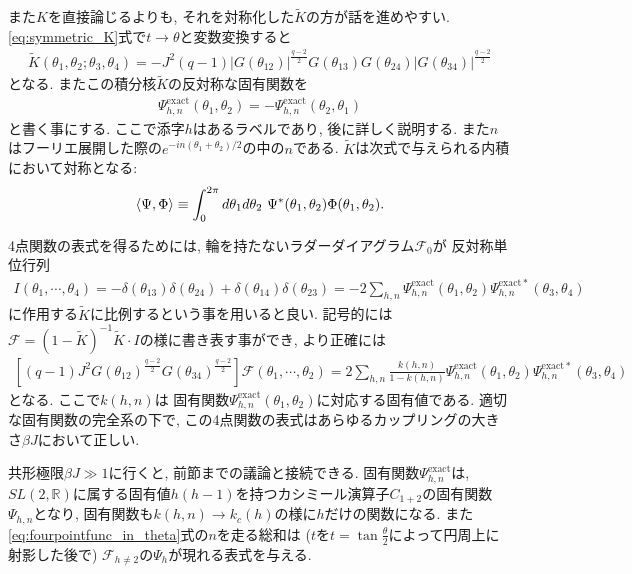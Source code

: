 また$K$を直接論じるよりも, それを対称化した$\tilde{K}$の方が話を進めやすい. 
\eqref{eq:symmetric_K}式で$t\to\theta$と変数変換すると
\begin{align}
	\tilde{K}(\theta_1, \theta_2; \theta_3, \theta_4)
	= -J^2(q-1)
		|G(\theta_{12})|^{\frac{q-2}{2}}
		G(\theta_{13})G(\theta_{24})
		|G(\theta_{34})|^{\frac{q-2}{2}}
	\label{eq:symmetric_K_in_theta}
\end{align}
となる. 
またこの積分核$\tilde{K}$の反対称な固有関数を
\begin{align}
	\Psi_{h,n}^{\mathrm{exact}}(\theta_1, \theta_2)
	= - \Psi_{h,n}^{\mathrm{exact}}(\theta_2, \theta_1)
\end{align}
と書く事にする. 
ここで添字$h$はあるラベルであり, 後に詳しく説明する. 
また$n$はフーリエ展開した際の$e^{-in(\theta_1 + \theta_2)/2}$の中の$n$である. 
$\tilde{K}$は次式で与えられる内積において対称となる:
\begin{align}
	\langle \Psi, \Phi \rangle \equiv
	\int_0^{2\pi}d\theta_1d\theta_2\ \Psi^*(\theta_1, \theta_2)\Phi(\theta_1, \theta_2).
	\label{eq:innerprod_in_finite_temp}
\end{align}

4点関数の表式を得るためには, 輪を持たないラダーダイアグラム$\mathcal{F}_0$が
反対称単位行列
\begin{align}
	I(\theta_1, \cdots, \theta_4)
	= -\delta(\theta_{13})\delta(\theta_{24}) + \delta(\theta_{14})\delta(\theta_{23})
	= -2\sum_{h,n}\Psi_{h,n}^{\mathrm{exact}}(\theta_1, \theta_2)
		\Psi_{h,n}^{\mathrm{exact}*}(\theta_3, \theta_4)
\end{align}
に作用する$\tilde{K}$に比例するという事を用いると良い. 
記号的には$\mathcal{F} = (1 - \tilde{K})^{-1}\tilde{K}\cdot I$の様に書き表す事ができ, 
より正確には
\begin{align}
	\left[(q-1)J^2G(\theta_{12})^{\frac{q-2}{2}}G(\theta_{34})^{\frac{q-2}{2}}\right]
	\mathcal{F}(\theta_1,\cdots,\theta_2) = 
	2\sum_{h,n}\frac{k(h,n)}{1-k(h,n)}
		\Psi_{h,n}^{\mathrm{exact}}(\theta_1, \theta_2)
		\Psi_{h,n}^{\mathrm{exact}*}(\theta_3, \theta_4)
	\label{eq:fourpointfunc_in_theta}
\end{align}
となる. ここで$k(h,n)$は
固有関数$\Psi_{h,n}^{\mathrm{exact}}(\theta_1, \theta_2)$に対応する固有値である. 
適切な固有関数の完全系の下で, この4点関数の表式はあらゆるカップリングの大きさ$\beta J$において正しい. 

共形極限$\beta J \gg 1$に行くと, 前節までの議論と接続できる. 
固有関数$\Psi_{h,n}^{\mathrm{exact}}$は, 
$SL(2,\mathbb{R})$に属する固有値$h(h-1)$を持つカシミール演算子$C_{1+2}$の固有関数$\Psi_{h,n}$となり, 
固有関数も$k(h,n)\to k_c(h)$の様に$h$だけの関数になる. 
また\eqref{eq:fourpointfunc_in_theta}式の$n$を走る総和は
($t$を$t = \tan\frac{\theta}{2}$によって円周上に射影した後で)
$\mathcal{F}_{h\neq 2}$の$\Psi_h$が現れる表式を与える. 

